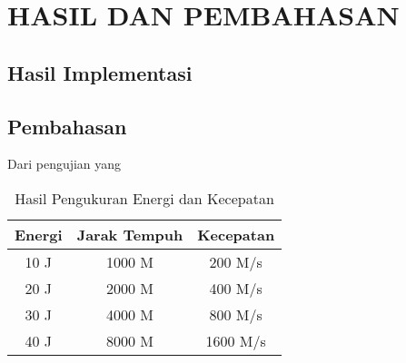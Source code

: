 \chapter{HASIL DAN PEMBAHASAN}
\label{chap:hasil-pembahasan}

\section{Hasil Implementasi}
\label{sec:hasil-implementasi}

\section{Pembahasan}
\label{sec:pembahasan}

Dari pengujian yang

\begin{longtable}{|c|c|c|}
  \caption{Hasil Pengukuran Energi dan Kecepatan}
  \label{tb:EnergiKecepatan}                                   \\
  \hline
  \rowcolor[HTML]{C0C0C0}
  \textbf{Energi} & \textbf{Jarak Tempuh} & \textbf{Kecepatan} \\
  \hline
  10 J            & 1000 M                & 200 M/s            \\
  20 J            & 2000 M                & 400 M/s            \\
  30 J            & 4000 M                & 800 M/s            \\
  40 J            & 8000 M                & 1600 M/s           \\
  \hline
\end{longtable}

